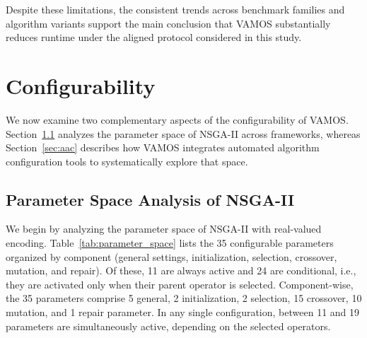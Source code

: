 \documentclass[final,5p,times,twocolumn]{elsarticle}
\newcommand{\VAMOS}{VAMOS}
\begin{document}
Despite these limitations, the consistent trends across benchmark families and algorithm variants support the main conclusion that \VAMOS{} substantially reduces runtime under the aligned protocol considered in this study.

\section{Configurability}
\label{sec:configurability}
We now examine two complementary aspects of the configurability of \VAMOS{}. Section~\ref{sec:parameter_space} analyzes the parameter space of NSGA-II across frameworks, whereas Section~\ref{sec:aac} describes how \VAMOS{} integrates automated algorithm configuration tools to systematically explore that space.

\subsection{Parameter Space Analysis of NSGA-II}
\label{sec:parameter_space}
We begin by analyzing the parameter space of NSGA-II with real-valued encoding. Table~\ref{tab:parameter_space} lists the 35 configurable parameters organized by component (general settings, initialization, selection, crossover, mutation, and repair). Of these, 11 are always active and 24 are conditional, i.e., they are activated only when their parent operator is selected. Component-wise, the 35 parameters comprise 5 general, 2 initialization, 2 selection, 15 crossover, 10 mutation, and 1 repair parameter. In any single configuration, between 11 and 19 parameters are simultaneously active, depending on the selected operators.
\end{document}
